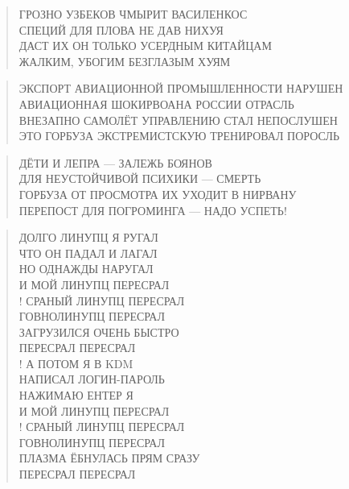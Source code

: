 \poemtitle{***}
\begin{verse}
ГРОЗНО УЗБЕКОВ ЧМЫРИТ ВАСИЛЕНКОС\\
СПЕЦИЙ ДЛЯ ПЛОВА НЕ ДАВ НИХУЯ\\
ДАСТ ИХ ОН ТОЛЬКО УСЕРДНЫМ КИТАЙЦАМ\\
ЖАЛКИМ, УБОГИМ БЕЗГЛАЗЫМ ХУЯМ
\end{verse}

\poemtitle{***}
\begin{verse}
ЭКСПОРТ АВИАЦИОННОЙ ПРОМЫШЛЕННОСТИ НАРУШЕН\\
АВИАЦИОННАЯ ШОКИРВОАНА РОССИИ ОТРАСЛЬ\\
ВНЕЗАПНО САМОЛЁТ УПРАВЛЕНИЮ СТАЛ НЕПОСЛУШЕН\\
ЭТО ГОРБУЗА ЭКСТРЕМИСТСКУЮ ТРЕНИРОВАЛ ПОРОСЛЬ
\end{verse}

\poemtitle{***}
\begin{verse}
ДЁТИ И ЛЕПРА — ЗАЛЕЖЬ БОЯНОВ\\
ДЛЯ НЕУСТОЙЧИВОЙ ПСИХИКИ — СМЕРТЬ\\
ГОРБУЗА ОТ ПРОСМОТРА ИХ УХОДИТ В НИРВАНУ\\
ПЕРЕПОСТ ДЛЯ ПОГРОМИНГА — НАДО УСПЕТЬ!
\end{verse}

\poemtitle{***}
\begin{verse}
ДОЛГО ЛИНУПЦ Я РУГАЛ\\
ЧТО ОН ПАДАЛ И ЛАГАЛ\\
НО ОДНАЖДЫ НАРУГАЛ\\
И МОЙ ЛИНУПЦ ПЕРЕСРАЛ\\!
СРАНЫЙ ЛИНУПЦ ПЕРЕСРАЛ\\
ГОВНОЛИНУПЦ ПЕРЕСРАЛ\\
ЗАГРУЗИЛСЯ ОЧЕНЬ БЫСТРО\\
ПЕРЕСРАЛ ПЕРЕСРАЛ\\!
А ПОТОМ Я В KDM\\
НАПИСАЛ ЛОГИН-ПАРОЛЬ\\
НАЖИМАЮ ЕНТЕР Я\\
И МОЙ ЛИНУПЦ ПЕРЕСРАЛ\\!
СРАНЫЙ ЛИНУПЦ ПЕРЕСРАЛ\\
ГОВНОЛИНУПЦ ПЕРЕСРАЛ\\
ПЛАЗМА ЁБНУЛАСЬ ПРЯМ СРАЗУ\\
ПЕРЕСРАЛ ПЕРЕСРАЛ
\end{verse}

